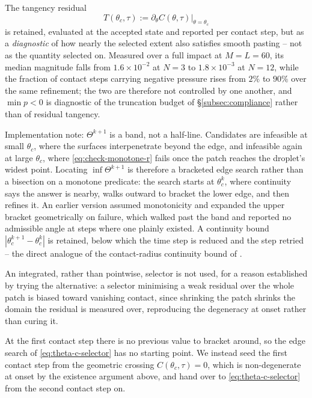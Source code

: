 The tangency residual
\begin{equation}
    T(\theta_c,\tau) := \partial_\theta C(\theta,\tau)\big|_{\theta=\theta_c}
    \label{eq:tangency-selector}
\end{equation}
is retained, evaluated at the accepted state and reported per contact step, but as a \emph{diagnostic} of how nearly the selected extent also satisfies smooth pasting -- not as the quantity selected on. Measured over a full impact at $M=L=60$, its median magnitude falls from $1.6\times10^{-2}$ at $N=3$ to $1.8\times10^{-3}$ at $N=12$, while the fraction of contact steps carrying negative pressure rises from $2\%$ to $90\%$ over the same refinement; the two are therefore not controlled by one another, and $\min p<0$ is diagnostic of the truncation budget of \S\ref{subsec:compliance} rather than of residual tangency.

Implementation note: $\Theta^{k+1}$ is a band, not a half-line. Candidates are infeasible at small $\theta_c$, where the surfaces interpenetrate beyond the edge, and infeasible again at large $\theta_c$, where \eqref{eq:check-monotone-r} fails once the patch reaches the droplet's widest point. Locating $\inf\Theta^{k+1}$ is therefore a bracketed edge search rather than a bisection on a monotone predicate: the search starts at $\theta_c^k$, where continuity says the answer is nearby, walks outward to bracket the lower edge, and then refines it. An earlier version assumed monotonicity and expanded the upper bracket geometrically on failure, which walked past the band and reported no admissible angle at steps where one plainly existed. A continuity bound $|\theta_c^{k+1}-\theta_c^k|$ is retained, below which the time step is reduced and the step retried -- the direct analogue of the contact-radius continuity bound of \cite{AgueroEtAl2026}.

An integrated, rather than pointwise, selector is not used, for a reason established by trying the alternative: a selector minimising a weak residual over the whole patch is biased toward vanishing contact, since shrinking the patch shrinks the domain the residual is measured over, reproducing the degeneracy at onset rather than curing it.

At the first contact step there is no previous value to bracket around, so the edge search of \eqref{eq:theta-c-selector} has no starting point. We instead seed the first contact step from the geometric crossing $C(\theta_c,\tau)=0$, which is non-degenerate at onset by the existence argument above, and hand over to \eqref{eq:theta-c-selector} from the second contact step on.

